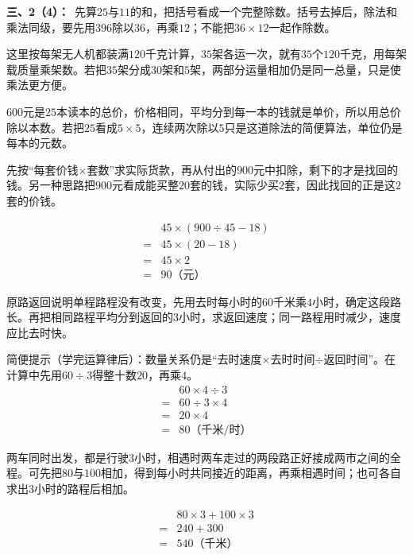 \documentclass[multi=snippet,border=0pt]{standalone}
\newenvironment{snippet}[3]{\begin{minipage}{#1bp}\color{answerred}\fontsize{#2}{#3}\selectfont\raggedright}{\end{minipage}}
\begin{document}
\begin{snippet}{505}{11.5}{14}\textbf{三、2（4）：}\ 先算\(25\)与\(11\)的和，把括号看成一个完整除数。括号去掉后，除法和乘法同级，要先用\(396\)除以\(36\)，再乘\(12\)；不能把\(36\times12\)一起作除数。\end{snippet}
\begin{snippet}{505}{11.5}{14}这里按每架无人机都装满\(120\)千克计算，\(35\)架各运一次，就有\(35\)个\(120\)千克，用每架载质量乘架数。若把\(35\)架分成\(30\)架和\(5\)架，两部分运量相加仍是同一总量，只是使乘法更方便。\end{snippet}
\begin{snippet}{505}{11.5}{14}\(600\)元是\(25\)本读本的总价，价格相同，平均分到每一本的钱就是单价，所以用总价除以本数。若把\(25\)看成\(5\times5\)，连续两次除以\(5\)只是这道除法的简便算法，单位仍是每本的元数。\end{snippet}
\begin{snippet}{505}{11.5}{14}先按“每套价钱\(\times\)套数”求实际货款，再从付出的\(900\)元中扣除，剩下的才是找回的钱。另一种思路把\(900\)元看成能买整\(20\)套的钱，实际少买\(2\)套，因此找回的正是这\(2\)套的价钱。\par \[\begin{aligned}&45\times(900\div45-18)\\={}&45\times(20-18)\\={}&45\times2\\={}&90\text{（元）}\end{aligned}\]\end{snippet}
\begin{snippet}{505}{11.5}{14}原路返回说明单程路程没有改变，先用去时每小时的\(60\)千米乘\(4\)小时，确定这段路长。再把相同路程平均分到返回的\(3\)小时，求返回速度；同一路程用时减少，速度应比去时快。\par 简便提示（学完运算律后）：数量关系仍是“去时速度\(\times\)去时时间\(\div\)返回时间”。在计算中先用\(60\div3\)得整十数\(20\)，再乘\(4\)。\[\begin{aligned}&60\times4\div3\\={}&60\div3\times4\\={}&20\times4\\={}&80\text{（千米/时）}\end{aligned}\]\end{snippet}
\begin{snippet}{505}{11.5}{14}两车同时出发，都是行驶\(3\)小时，相遇时两车走过的两段路正好接成两市之间的全程。可先把\(80\)与\(100\)相加，得到每小时共同接近的距离，再乘相遇时间；也可各自求出\(3\)小时的路程后相加。\par \[\begin{aligned}&80\times3+100\times3\\={}&240+300\\={}&540\text{（千米）}\end{aligned}\]\end{snippet}
\end{document}

